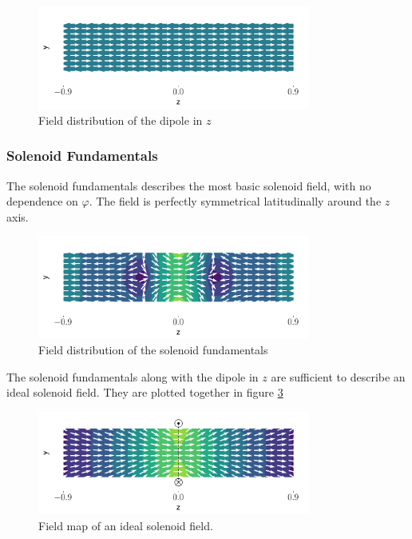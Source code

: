 \begin{figure}[h]
    \label{fig:zdip}
    \centering
    \includegraphics[width=0.8\textwidth]{figs/zdip.png}
    \caption{Field distribution of the dipole in $z$}
\end{figure}

\subsubsection{Solenoid Fundamentals}
The solenoid fundamentals describes the most basic solenoid
field, with no dependence on $\varphi$. The field is
perfectly symmetrical latitudinally around the $z$ axis.

\begin{figure}
    \centering
    \includegraphics[width=0.8\textwidth]{figs/solfun.png}
    \caption{Field distribution of the solenoid fundamentals}
    \label{fig:solfun}
\end{figure}

The solenoid fundamentals along with the dipole in $z$ are
sufficient to describe an ideal solenoid field. They are
plotted together in figure \ref{fig:solfundip}

\begin{figure}
    \centering
    \includegraphics[width=0.8\textwidth]{figs/solfundip.png}
    \caption{Field map of an ideal solenoid field.}
    \label{fig:solfundip}
\end{figure}

